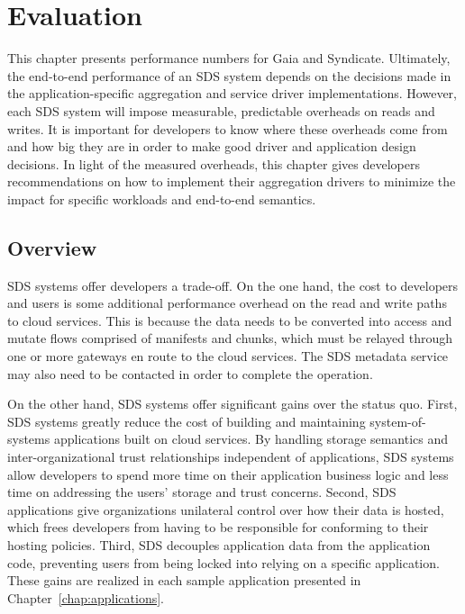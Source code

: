 \chapter{Evaluation}
\label{chap:evaluation}

This chapter presents performance numbers for Gaia and Syndicate.
Ultimately, the end-to-end performance of an SDS system depends on the decisions
made in the application-specific aggregation and service driver implementations.
 However, each SDS system will impose measurable, predictable overheads on
reads and writes.  It is important for developers to know where these overheads
come from and how big they are in order to make good driver and application design decisions.
In light of the measured overheads, this chapter gives developers
recommendations on how to implement their aggregation drivers to minimize the
impact for specific workloads and end-to-end semantics.

\section{Overview}

SDS systems offer developers a trade-off.  On the one hand, the cost to
developers and users is some additional performance overhead on the read and write paths to cloud services.
This is because the data needs to be converted
into access and mutate flows comprised of manifests and chunks, which must be
relayed through one or more gateways en route to the cloud services.
The SDS metadata service may also need to be contacted in order to
complete the operation.

On the other hand, SDS systems offer significant gains over the status quo.
First, SDS systems greatly reduce the cost of building and maintaining
system-of-systems applications built on cloud services.  By handling storage
semantics and inter-organizational trust relationships
independent of applications, SDS systems allow developers to spend more time on
their application business logic and less time on addressing the users'
storage and trust concerns.  Second, SDS applications
give organizations unilateral control over how
their data is hosted, which frees developers from having to be
responsible for conforming to their hosting policies.
Third, SDS decouples application data from the application
code, preventing users from being locked into relying on a specific
application.  These gains are realized in each
sample application presented in Chapter~\ref{chap:applications}.

